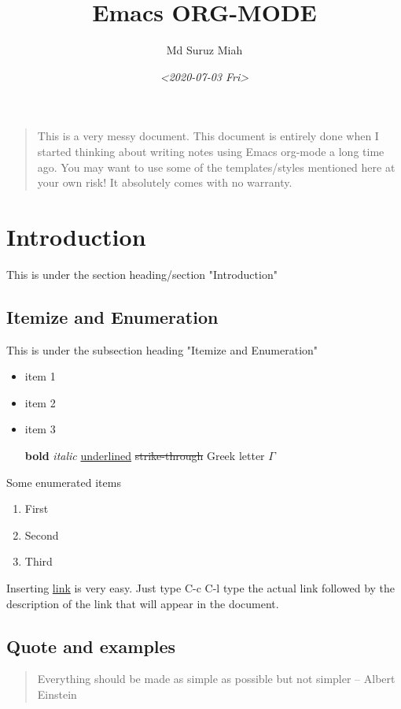\documentclass[11pt]{article}
\author{Md Suruz Miah}
\date{\textit{<2020-07-03 Fri>}}
\title{Emacs ORG-MODE}
\begin{document}
\maketitle
\tableofcontents

\begin{quote}
This is a very messy document. This document is entirely done when I started thinking about writing notes using Emacs org-mode a long time ago. You may want to use some of the templates/styles mentioned here at your own risk! It absolutely comes with no warranty. 
\end{quote}



\section{Introduction}
\label{sec:orgd20ee65}

This is under the section heading/section "Introduction"

\subsection{Itemize and Enumeration}
\label{sec:org7fca5a6}

This is under the subsection heading "Itemize and Enumeration"
\begin{itemize}
\item item 1
\item item 2
\item item 3

\textbf{bold} \emph{italic} \uline{underlined} \sout{strike-through} Greek letter \(\Gamma\)
\end{itemize}
Some enumerated  items 
\begin{enumerate}
\item First
\item Second
\item Third
\end{enumerate}

Inserting \href{http://www.personalpages.bradley.edu/\~smiah}{link} is very easy. Just type C-c C-l type the actual link followed by the description of the link that will appear in the document. 
\subsection{Quote and examples}
\label{sec:org7cf402b}

\begin{quote}
Everything should be made as simple as possible but not simpler -- Albert Einstein
\end{quote}
\end{document}
